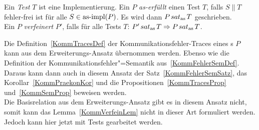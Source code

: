 \begin{Def}
  \label{KommTestDef}
  Ein \emph{Test} $T$ ist eine Implementierung. Ein \MEIO{} $P$
  \emph{as-erfüllt} einen Test $T$, falls $S\|T$ fehler-frei ist für alle $S\in
  \mathrm{as}\text{-}\mathrm{impl} (P)$. Es wird dann $P \hspace{0.05cm}sat_\mathrm{as}\hspace{0.05cm} T$ geschrieben.\\
  Ein \MEIO{} $P$ \emph{verfeinert} $P'$, falls für alle Tests $T$: $P'\hspace{0.05cm}sat_\mathrm{as}\hspace{0.05cm} T
  \Rightarrow P\hspace{0.05cm}sat_\mathrm{as}\hspace{0.05cm} T$.
\end{Def}

Die Definition~\ref{KommTracesDef} der Kommunikationsfehler-Traces eines
\MEIO{}s $P$ kann aus dem Erweiterungs-Ansatz übernommen werden. Ebenso wie die
Definition der Kommunikationsfehler"=Semantik aus~\ref{KommFehlerSemDef}.
Daraus kann dann auch in diesem Ansatz der Satz~\ref{KommFehlerSemSatz}, das
Korollar~\ref{KommPraekonKor} und die Propositionen~\ref{KommTracesProp}
und~\ref{KommSemProp} beweisen werden.\\
Die Basisrelation aus dem Erweiterungs-Ansatz gibt es in diesem Ansatz nicht,
somit kann das Lemma~\ref{KommVerfeinLem} nicht in dieser Art formuliert
werden. Jedoch kann hier jetzt mit Tests gearbeitet werden.

